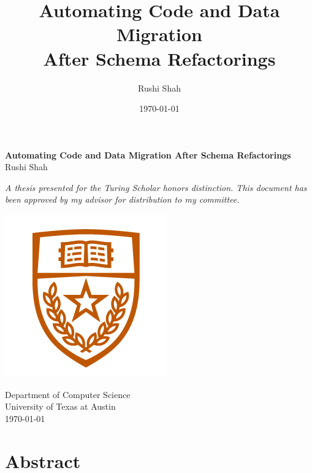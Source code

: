 \documentclass[]{article}
\author{Rushi Shah}
\date{\today}
\title{Automating Code and Data Migration \\ After Schema Refactorings}
\begin{document}
    
\begin{titlepage}
    \begin{center}
        \vspace*{1cm}
            
        \huge
        \textbf{Automating Code and Data Migration After Schema Refactorings \\}
        \vspace{0.5cm}
        \Large
        Rushi Shah


        \vspace{1.5cm}
        \large
        \textit{A thesis presented for the Turing Scholar honors distinction. This document has been approved by my advisor for distribution to my committee.}
            
            
        \vfill
            
            
            
        \includegraphics[width=.4\textwidth]{texas_shield}

        \vfill
            
        \Large
        Department of Computer Science\\
        University of Texas at Austin\\
        \today
            
    \end{center}
\end{titlepage}

    \maketitle

    \section{Abstract}
\end{document}
